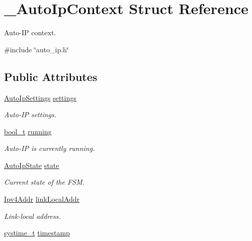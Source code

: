 \hypertarget{struct__AutoIpContext}{}\section{\+\_\+\+Auto\+Ip\+Context Struct Reference}
\label{struct__AutoIpContext}


Auto-\/\+IP context.  




{\ttfamily \#include \char`\"{}auto\+\_\+ip.\+h\char`\"{}}

\subsection*{Public Attributes}
\begin{DoxyCompactItemize}
\item 
\hyperlink{structAutoIpSettings}{Auto\+Ip\+Settings} \hyperlink{struct__AutoIpContext_a67a8a13ceb66aa891cd7164dffbaeac7}{settings}
\begin{DoxyCompactList}\small\item\em Auto-\/\+IP settings. \end{DoxyCompactList}\item 
\hyperlink{compiler__port_8h_a812d16e5494522586b3784e55d479912}{bool\+\_\+t} \hyperlink{struct__AutoIpContext_a0f9f1ff73a6b7d650d4ea77ddc151e82}{running}
\begin{DoxyCompactList}\small\item\em Auto-\/\+IP is currently running. \end{DoxyCompactList}\item 
\hyperlink{auto__ip_8h_a76eb539c3a130a13ca891530f25f4625}{Auto\+Ip\+State} \hyperlink{struct__AutoIpContext_aa11235cf8b7769f2ff5312e44e7b5078}{state}
\begin{DoxyCompactList}\small\item\em Current state of the F\+SM. \end{DoxyCompactList}\item 
\hyperlink{ipv4_8h_a411debb3d770caa0c06d3f73367da37f}{Ipv4\+Addr} \hyperlink{struct__AutoIpContext_a9cb9258b6118f972a659e2742e9caaed}{link\+Local\+Addr}
\begin{DoxyCompactList}\small\item\em Link-\/local address. \end{DoxyCompactList}\item 
\hyperlink{compiler__port_8h_ae3e32a98d431a02106616da3071832dd}{systime\+\_\+t} \hyperlink{struct__AutoIpContext_aec2d3543fe0ddd32bef9bd32a1869082}{timestamp}

\end{DoxyCompactItemize}
